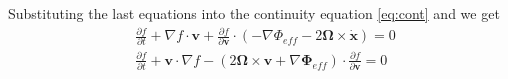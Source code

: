 Substituting the last equations into the continuity equation \ref{eq:cont} and  we get
\begin{align*}
    &\frac{\partial f}{\partial t} + \nabla f\cdot \mathbf{v} + \frac{\partial f}{\partial \mathbf{v}}\cdot (-\nabla\Phi_{eff} - 2\mathbf{\Omega}\times\dot{\mathbf{x}}) =0\\
    &\frac{\partial f}{\partial t}+\mathbf{v}\cdot\nabla f - \left(2\mathbf{\Omega}\times\mathbf{v}+\nabla\mathbf{\Phi}_{eff}\right)\cdot\frac{\partial f}{\partial \mathbf{v}}=0
\end{align*}



